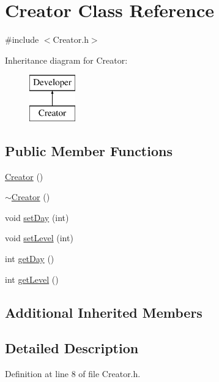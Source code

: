\hypertarget{class_creator}{}\section{Creator Class Reference}
\label{class_creator}


{\ttfamily \#include $<$Creator.\+h$>$}

Inheritance diagram for Creator\+:\begin{figure}[H]
\begin{center}
\leavevmode
\includegraphics[height=2.000000cm]{class_creator}
\end{center}
\end{figure}
\subsection*{Public Member Functions}
\begin{DoxyCompactItemize}
\item 
\hyperlink{class_creator_abdde228294a78387338fe874accd629b}{Creator} ()
\item 
\hyperlink{class_creator_af8ecf377073058ea5156afa2e79f901e}{$\sim$\+Creator} ()
\item 
void \hyperlink{class_creator_acd24fa39930d724d13a21f30ec423e4f}{set\+Day} (int)
\item 
void \hyperlink{class_creator_a08a3e34a0fd9f2f0005f1fefd05f4f96}{set\+Level} (int)
\item 
int \hyperlink{class_creator_a154311115ed492e31eec167458a6ec11}{get\+Day} ()
\item 
int \hyperlink{class_creator_aa8247cf632e973741f6905a1030b9306}{get\+Level} ()
\end{DoxyCompactItemize}
\subsection*{Additional Inherited Members}


\subsection{Detailed Description}


Definition at line 8 of file Creator.\+h.



